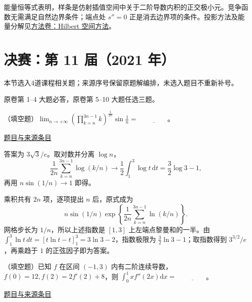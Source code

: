\documentclass[12pt,fontset=fandol]{ctexart}
\begin{document}
\begin{remark}[方法与条件]能量恒等式表明，样条是仿射插值空间中关于二阶导数内积的正交极小元。竞争函数无需满足自然边界条件；端点处 $s''=0$ 正是消去边界项的条件。投影方法及能量分解见\hyperref[app:integration-hilbert]{方法卷：Hilbert 空间方法}。\end{remark}

\section{决赛：第 11 届（2021 年）}

本节选入4道课程相关题；来源序号保留原题解编排，未选入题目不重新补号。

\begin{remark}[来源说明]原卷第 1--4 大题必答，原卷第 5--10 大题任选三题。\end{remark}

\begin{example}[来源序号1]\label{ex:fin11-high:1}\label{pr:fin11-high:1}

（填空题）$\lim_{n \to +\infty} \left( \prod_{k=n}^{3n-1} k \right)^{\frac{1}{2n}} \sin \frac{1}{n} = $ $\underline{\qquad\qquad}$。

\par\href{https://github.com/lzxcr/cmc-mathematics/blob/64916fa1fdbc3e444a652eca204d5669058ee321/src/problems/finals/11/01.md}{题目与来源条目}

\end{example}

\begin{solve}\label{ans:fin11-high:1}

答案为 $3\sqrt3/e$。取对数并分离 $\log n$，
\[
\frac1{2n}\sum_{k=n}^{3n-1}\log(k/n)\longrightarrow\frac12\int_1^3\log t\,\mathrm dt=\frac32\log3-1,
\]
再用 $n\sin(1/n)\to1$ 即得。

乘积共有 $2n$ 项，逐项提出 $n$ 后，原式成为
\[
n\sin(1/n)\exp\left\{\frac1{2n}\sum_{k=n}^{3n-1}\ln(k/n)\right\}.
\]
网格步长为 $1/n$，所以上述指数是 $[1,3]$ 上左端点黎曼和的一半。由 $\int_1^3\ln t\,dt=[t\ln t-t]_1^3=3\ln3-2$，指数极限为 $\tfrac32\ln3-1$；取指数得到 $3^{3/2}/e$，再乘趋于 $1$ 的正弦因子即为答案。

\end{solve}

\begin{example}[来源序号2]\label{ex:fin11-high:2}\label{pr:fin11-high:2}

（填空题）已知 $f$ 在区间 $(-1,3)$ 内有二阶连续导数，$f(0) = 12, f(2) = 2f'(2) + 8$，则 $\int_{0}^{1} xf''(2x) \mathrm{d} x = $ $\underline{\qquad\qquad}$。

\par\href{https://github.com/lzxcr/cmc-mathematics/blob/64916fa1fdbc3e444a652eca204d5669058ee321/src/problems/finals/11/02.md}{题目与来源条目}

\end{example}
\end{document}
